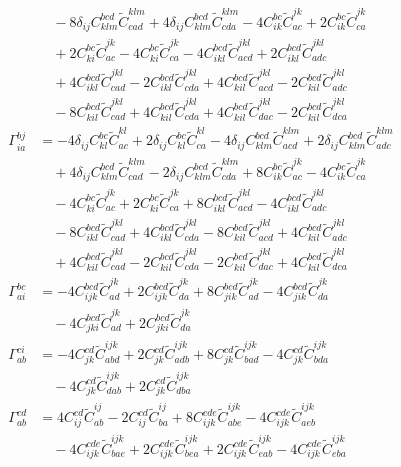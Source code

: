 \begin{align}
&\quad -8 \delta_{ij} C^{bcd}_{klm} \widetilde{C}^{klm}_{cad} + 4 \delta_{ij} C^{bcd}_{klm} \widetilde{C}^{klm}_{cda} - 4 C^{bc}_{ik} \widetilde{C}^{jk}_{ac} + 2 C^{bc}_{ik} \widetilde{C}^{jk}_{ca} \\
&\quad {}+ 2 C^{bc}_{ki} \widetilde{C}^{jk}_{ac} - 4 C^{bc}_{ki} \widetilde{C}^{jk}_{ca} - 4 C^{bcd}_{ikl} \widetilde{C}^{jkl}_{acd} + 2 C^{bcd}_{ikl} \widetilde{C}^{jkl}_{adc} \\
&\quad {}+ 4 C^{bcd}_{ikl} \widetilde{C}^{jkl}_{cad} - 2 C^{bcd}_{ikl} \widetilde{C}^{jkl}_{cda} + 4 C^{bcd}_{kil} \widetilde{C}^{jkl}_{acd} - 2 C^{bcd}_{kil} \widetilde{C}^{jkl}_{adc} \\
&\quad -8 C^{bcd}_{kil} \widetilde{C}^{jkl}_{cad} + 4 C^{bcd}_{kil} \widetilde{C}^{jkl}_{cda} + 4 C^{bcd}_{kil} \widetilde{C}^{jkl}_{dac} - 2 C^{bcd}_{kil} \widetilde{C}^{jkl}_{dca} \\
\Gamma^{bj}_{ia} &= -4 \delta_{ij} C^{bc}_{kl} \widetilde{C}^{kl}_{ac} + 2 \delta_{ij} C^{bc}_{kl} \widetilde{C}^{kl}_{ca} - 4 \delta_{ij} C^{bcd}_{klm} \widetilde{C}^{klm}_{acd} + 2 \delta_{ij} C^{bcd}_{klm} \widetilde{C}^{klm}_{adc} \\
&\quad {}+ 4 \delta_{ij} C^{bcd}_{klm} \widetilde{C}^{klm}_{cad} - 2 \delta_{ij} C^{bcd}_{klm} \widetilde{C}^{klm}_{cda} + 8 C^{bc}_{ik} \widetilde{C}^{jk}_{ac} - 4 C^{bc}_{ik} \widetilde{C}^{jk}_{ca} \\
&\quad -4 C^{bc}_{ki} \widetilde{C}^{jk}_{ac} + 2 C^{bc}_{ki} \widetilde{C}^{jk}_{ca} + 8 C^{bcd}_{ikl} \widetilde{C}^{jkl}_{acd} - 4 C^{bcd}_{ikl} \widetilde{C}^{jkl}_{adc} \\
&\quad -8 C^{bcd}_{ikl} \widetilde{C}^{jkl}_{cad} + 4 C^{bcd}_{ikl} \widetilde{C}^{jkl}_{cda} - 8 C^{bcd}_{kil} \widetilde{C}^{jkl}_{acd} + 4 C^{bcd}_{kil} \widetilde{C}^{jkl}_{adc} \\
&\quad {}+ 4 C^{bcd}_{kil} \widetilde{C}^{jkl}_{cad} - 2 C^{bcd}_{kil} \widetilde{C}^{jkl}_{cda} - 2 C^{bcd}_{kil} \widetilde{C}^{jkl}_{dac} + 4 C^{bcd}_{kil} \widetilde{C}^{jkl}_{dca} \\
\Gamma^{bc}_{ai} &= -4 C^{bcd}_{ijk} \widetilde{C}^{jk}_{ad} + 2 C^{bcd}_{ijk} \widetilde{C}^{jk}_{da} + 8 C^{bcd}_{jik} \widetilde{C}^{jk}_{ad} - 4 C^{bcd}_{jik} \widetilde{C}^{jk}_{da} \\
&\quad -4 C^{bcd}_{jki} \widetilde{C}^{jk}_{ad} + 2 C^{bcd}_{jki} \widetilde{C}^{jk}_{da} \\
\Gamma^{ci}_{ab} &= -4 C^{cd}_{jk} \widetilde{C}^{ijk}_{abd} + 2 C^{cd}_{jk} \widetilde{C}^{ijk}_{adb} + 8 C^{cd}_{jk} \widetilde{C}^{ijk}_{bad} - 4 C^{cd}_{jk} \widetilde{C}^{ijk}_{bda} \\
&\quad -4 C^{cd}_{jk} \widetilde{C}^{ijk}_{dab} + 2 C^{cd}_{jk} \widetilde{C}^{ijk}_{dba} \\
\Gamma^{cd}_{ab} &= 4 C^{cd}_{ij} \widetilde{C}^{ij}_{ab} - 2 C^{cd}_{ij} \widetilde{C}^{ij}_{ba} + 8 C^{cde}_{ijk} \widetilde{C}^{ijk}_{abe} - 4 C^{cde}_{ijk} \widetilde{C}^{ijk}_{aeb} \\
&\quad -4 C^{cde}_{ijk} \widetilde{C}^{ijk}_{bae} + 2 C^{cde}_{ijk} \widetilde{C}^{ijk}_{bea} + 2 C^{cde}_{ijk} \widetilde{C}^{ijk}_{eab} - 4 C^{cde}_{ijk} \widetilde{C}^{ijk}_{eba}
\end{align}

